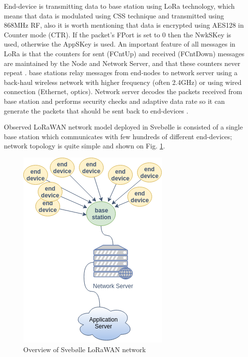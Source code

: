 \documentclass[10pt, a4paper]{article} %
\begin{document}
End-device is transmitting data to base station using LoRa technology, which means that data is modulated using CSS technique and transmitted using 868MHz RF, also it is worth mentioning that data is encrypted using AES128 in Counter mode (CTR). If the packet’s FPort is set to 0 then the NwkSKey is used, otherwise the AppSKey is used. An important feature of all messages in LoRa is that the counters for sent (FCntUp) and received (FCntDown) messages are maintained by the Node and Network Server, and that these counters never repeat \cite{Miller_LoRaSecurity}.
base stations relay messages from end-nodes to network server using a back-haul wireless network with higher frequency (often 2.4GHz) or using wired connection (Ethernet, optics). 
Network server decodes the packets received from base station and performs security checks and adaptive data rate so it can generate the packets that should be sent back to end-devices \cite{Silva_LoRaWAN}.

Observed LoRaWAN network model deployed in Svebølle is consisted of a single base station which communicates with few hundreds of different end-devices; network topology is quite simple and shown on Fig. \ref{svebolle}.
\begin{figure}
	\centering
	\includegraphics[scale=.7]{images/Svebolle-Topology.png} %
	\caption{Overview of Svebølle LoRaWAN network} %
	\label{svebolle} 
\end{figure}
\end{document}
